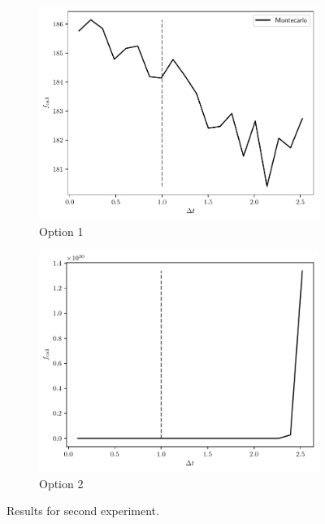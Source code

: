 \documentclass[11pt]{article}
\theoremstyle{definition}
\theoremstyle{remark}
\theoremstyle{remark}
\begin{document}
\begin{figure}[]
  \centering
  \begin{subfigure}[b]{0.45\textwidth}
    \centering
    \includegraphics[scale=.5]{../plts/fifth_c_sens_opt1}
    \caption{Option 1}
  \end{subfigure}
  \begin{subfigure}[b]{0.45\textwidth}
    \centering
    \includegraphics[scale=.5]{../plts/fifth_c_sens_opt2}
    \caption{Option 2}
  \end{subfigure}
  \caption{Results for second experiment.}
  \label{fig:fs53}
\end{figure}
\end{document}
